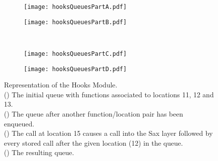 \documentclass[12pt]{report}
\begin{document}
\begin{figure}
\begin{center}
\begin{subfigure}[t]{.4\linewidth}
	\caption{}
	\label{hooksQueuesA}
	\texttt{[image: hooksQueuesPartA.pdf]}
\end{subfigure}
\begin{subfigure}[t]{.4\linewidth}
	\caption{}
	\label{hooksQueuesB}
	\texttt{[image: hooksQueuesPartB.pdf]}
\end{subfigure} \\
\vspace{4mm}
\begin{subfigure}[t]{.4\linewidth}
	\caption{}
	\label{hooksQueuesC}
	\texttt{[image: hooksQueuesPartC.pdf]}
\end{subfigure}
\begin{subfigure}[t]{.4\linewidth}
	\caption{}
	\label{hooksQueuesD}
	\texttt{[image: hooksQueuesPartD.pdf]}
\end{subfigure}
\end{center}
\caption[Representation of the Hooks Module]{Representation of the Hooks Module. \\() The initial queue with functions associated to locations 11, 12 and 13. \\() The queue after another function\slash location pair has been enqueued. \\ () The call at location 15 causes a call into the Sax layer followed by every stored call after the given location (12) in the queue. \\ () The resulting queue.}
\label{hooksQueues}
\end{figure}
\end{document}
